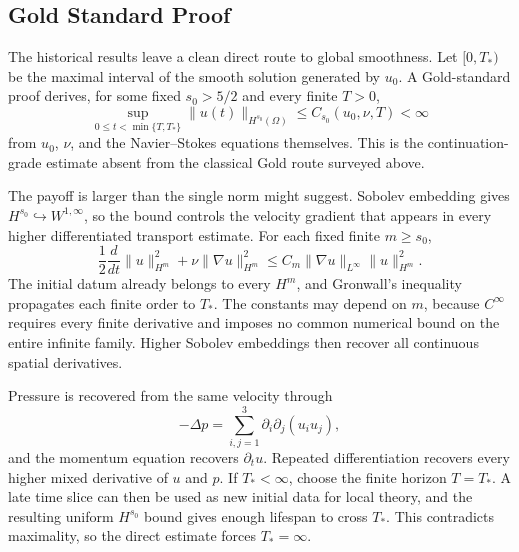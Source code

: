 \subsection{Gold Standard Proof}\label{sub:GoldStandardProof}

The historical results leave a clean direct route to global smoothness.
Let \([0,T_*)\) be the maximal interval of the smooth solution generated by \(u_0\).
A Gold-standard proof derives, for some fixed \(s_0>5/2\) and every finite \(T>0\),
\[
  \sup_{0\leq t<\min\{T,T_*\}}
  \lVert u(t)\rVert_{H^{s_0}(\Omega)}
  \leq
  C_{s_0}(u_0,\nu,T)
  <
  \infty
\]
from \(u_0\), \(\nu\), and the Navier--Stokes equations themselves.
This is the continuation-grade estimate absent from the classical Gold route surveyed above.

The payoff is larger than the single norm might suggest.
Sobolev embedding gives \(H^{s_0}\hookrightarrow W^{1,\infty}\), so the bound controls the velocity gradient that appears in every higher differentiated transport estimate.
For each fixed finite \(m\geq s_0\),
\[
  \frac12\frac{d}{dt}\lVert u\rVert_{H^m}^{2}
  +\nu\lVert\nabla u\rVert_{H^m}^{2}
  \leq
  C_m\lVert\nabla u\rVert_{L^\infty}\lVert u\rVert_{H^m}^{2}.
\]
The initial datum already belongs to every \(H^m\), and Gronwall's inequality propagates each finite order to \(T_*\).
The constants may depend on \(m\), because \(C^\infty\) requires every finite derivative and imposes no common numerical bound on the entire infinite family.
Higher Sobolev embeddings then recover all continuous spatial derivatives.

Pressure is recovered from the same velocity through
\[
  -\Delta p
  =
  \sum_{i,j=1}^{3}\partial_i\partial_j(u_i u_j),
\]
and the momentum equation recovers \(\partial_tu\).
Repeated differentiation recovers every higher mixed derivative of \(u\) and \(p\).
If \(T_*<\infty\), choose the finite horizon \(T=T_*\).
A late time slice can then be used as new initial data for local theory, and the resulting uniform \(H^{s_0}\) bound gives enough lifespan to cross \(T_*\).
This contradicts maximality, so the direct estimate forces \(T_*=\infty\).

